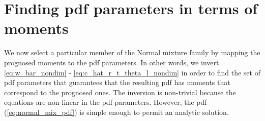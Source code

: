 \section{Finding pdf parameters in terms of moments}\label{sec:pdfparams}

We now select a particular member of the Normal mixture family by mapping the prognosed moments to the \gls{pdf} parameters.
In other words, we invert \cref{eq:w_bar_nondim} - \cref{eq:c_hat_r_t_theta_l_nondim} in order to find the set of \gls{pdf} parameters that guarantees that the resulting \gls{pdf} has moments that correspond to the prognosed ones.
The inversion is non-trivial because the equations are non-linear in the \gls{pdf} parameters.
However, the \gls{pdf} (\cref{eq:normal_mix_pdf}) is simple enough to permit an analytic solution.


